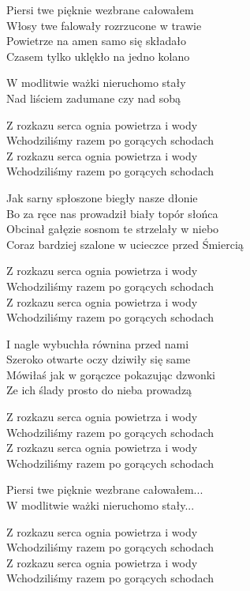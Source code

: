 \begin{text}
    \chordfill
    Piersi twe pięknie wezbrane całowałem\\
    Włosy twe falowały rozrzucone w trawie\\
    Powietrze na amen samo się składało\\
    Czasem tylko uklękło na jedno kolano

    W modlitwie ważki nieruchomo stały\\
    Nad liściem zadumane czy nad sobą

    \vin Z rozkazu serca ognia powietrza i wody\\
    \vin Wchodziliśmy razem po gorących schodach\\
    \vin Z rozkazu serca ognia powietrza i wody\\
    \vin Wchodziliśmy razem po gorących schodach

    Jak sarny spłoszone biegły nasze dłonie\\
    Bo za ręce nas prowadził biały topór słońca\\
    Obcinał gałęzie sosnom te strzelały w niebo\\
    Coraz bardziej szalone w ucieczce przed Śmiercią

    \vin Z rozkazu serca ognia powietrza i wody\\
    \vin Wchodziliśmy razem po gorących schodach\\
    \vin Z rozkazu serca ognia powietrza i wody\\
    \vin Wchodziliśmy razem po gorących schodach

    I nagle wybuchła równina przed nami\\
    Szeroko otwarte oczy dziwiły się same\\
    Mówiłaś jak w gorączce pokazując dzwonki\\
    Ze ich ślady prosto do nieba prowadzą

    \vin Z rozkazu serca ognia powietrza i wody\\
    \vin Wchodziliśmy razem po gorących schodach\\
    \vin Z rozkazu serca ognia powietrza i wody\\
    \vin Wchodziliśmy razem po gorących schodach
	
    Piersi twe pięknie wezbrane całowałem...\\
    W modlitwie ważki nieruchomo stały...

    \vin Z rozkazu serca ognia powietrza i wody\\
    \vin Wchodziliśmy razem po gorących schodach\\
    \vin Z rozkazu serca ognia powietrza i wody\\
    \vin Wchodziliśmy razem po gorących schodach

\end{text}
